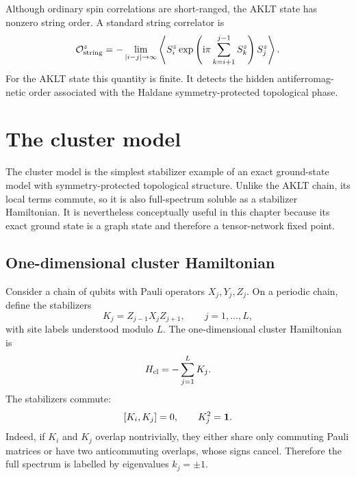 \begin{remark}
Although ordinary spin correlations are short-ranged, the AKLT state has
nonzero string order.  A standard string correlator is
\begin{equation}
\label{eq:aklt-string-order}
    \mathcal{O}_{\rm string}^z
    =
    -\lim_{\left|i-j\right|\to\infty}
    \left\langle
        S_i^z
        \exp\left(\mathrm{i}\pi\sum_{k=i+1}^{j-1}S_k^z\right)
        S_j^z
    \right\rangle .
\end{equation}
For the AKLT state this quantity is finite.  It detects the hidden antiferromag-
netic order associated with the Haldane symmetry-protected topological phase.
\end{remark}

\section{The cluster model}
\label{sec:cluster-model}

The cluster model is the simplest stabilizer example of an exact ground-state
model with symmetry-protected topological structure.  Unlike the AKLT chain,
its local terms commute, so it is also full-spectrum soluble as a stabilizer
Hamiltonian.  It is nevertheless conceptually useful in this chapter because its
exact ground state is a graph state and therefore a tensor-network fixed point.

\subsection{One-dimensional cluster Hamiltonian}
\label{subsec:one-dimensional-cluster-hamiltonian}

Consider a chain of qubits with Pauli operators \(X_j,Y_j,Z_j\).  On a periodic
chain, define the stabilizers
\begin{equation}
\label{eq:cluster-stabilizers-periodic}
    K_j
    =
    Z_{j-1}X_jZ_{j+1},
    \qquad
    j=1,\ldots,L,
\end{equation}
with site labels understood modulo \(L\).  The one-dimensional cluster
Hamiltonian is
\begin{equation}
\label{eq:cluster-hamiltonian-periodic}
    H_{\rm cl}
    =
    -\sum_{j=1}^{L}K_j .
\end{equation}
The stabilizers commute:
\begin{equation}
\label{eq:cluster-stabilizer-commutation}
    [K_i,K_j]=0,
    \qquad
    K_j^2=\mathbf{1} .
\end{equation}
Indeed, if \(K_i\) and \(K_j\) overlap nontrivially, they either share only
commuting Pauli matrices or have two anticommuting overlaps, whose signs cancel.
Therefore the full spectrum is labelled by eigenvalues \(k_j=\pm1\).

